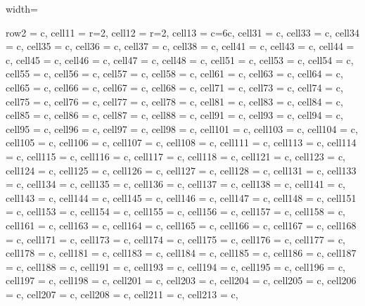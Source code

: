 \documentclass[lettersize,journal]{IEEEtran}
\begin{document}
\begin{table}
\caption{External Similarity and Diversity metrics for experimental datasets.}
\centering
\begin{adjustbox}{width=\textwidth}
\begin{tblr}{
  row{2} = {c}, cell{1}{1} = {r=2}{}, cell{1}{2} = {r=2}{}, cell{1}{3} = {c=6}{c}, cell{3}{1} = {c}, cell{3}{3} = {c}, cell{3}{4} = {c}, cell{3}{5} = {c}, cell{3}{6} = {c}, cell{3}{7} = {c}, cell{3}{8} = {c}, cell{4}{1} = {c},
  cell{4}{3} = {c}, cell{4}{4} = {c}, cell{4}{5} = {c}, cell{4}{6} = {c}, cell{4}{7} = {c}, cell{4}{8} = {c}, cell{5}{1} = {c}, cell{5}{3} = {c}, cell{5}{4} = {c}, cell{5}{5} = {c}, cell{5}{6} = {c}, cell{5}{7} = {c},
  cell{5}{8} = {c}, cell{6}{1} = {c}, cell{6}{3} = {c}, cell{6}{4} = {c}, cell{6}{5} = {c}, cell{6}{6} = {c}, cell{6}{7} = {c}, cell{6}{8} = {c}, cell{7}{1} = {c}, cell{7}{3} = {c}, cell{7}{4} = {c}, cell{7}{5} = {c},
  cell{7}{6} = {c}, cell{7}{7} = {c}, cell{7}{8} = {c}, cell{8}{1} = {c}, cell{8}{3} = {c}, cell{8}{4} = {c}, cell{8}{5} = {c}, cell{8}{6} = {c}, cell{8}{7} = {c}, cell{8}{8} = {c}, cell{9}{1} = {c}, cell{9}{3} = {c},
  cell{9}{4} = {c}, cell{9}{5} = {c}, cell{9}{6} = {c}, cell{9}{7} = {c}, cell{9}{8} = {c}, cell{10}{1} = {c}, cell{10}{3} = {c}, cell{10}{4} = {c}, cell{10}{5} = {c}, cell{10}{6} = {c}, cell{10}{7} = {c}, cell{10}{8} = {c},
  cell{11}{1} = {c}, cell{11}{3} = {c}, cell{11}{4} = {c}, cell{11}{5} = {c}, cell{11}{6} = {c}, cell{11}{7} = {c}, cell{11}{8} = {c}, cell{12}{1} = {c}, cell{12}{3} = {c}, cell{12}{4} = {c}, cell{12}{5} = {c}, cell{12}{6} = {c},
  cell{12}{7} = {c}, cell{12}{8} = {c}, cell{13}{1} = {c}, cell{13}{3} = {c},  cell{13}{4} = {c}, cell{13}{5} = {c}, cell{13}{6} = {c}, cell{13}{7} = {c}, cell{13}{8} = {c}, cell{14}{1} = {c}, cell{14}{3} = {c}, cell{14}{4} = {c},
  cell{14}{5} = {c}, cell{14}{6} = {c}, cell{14}{7} = {c}, cell{14}{8} = {c}, cell{15}{1} = {c}, cell{15}{3} = {c}, cell{15}{4} = {c}, cell{15}{5} = {c}, cell{15}{6} = {c}, cell{15}{7} = {c}, cell{15}{8} = {c}, cell{16}{1} = {c},
  cell{16}{3} = {c}, cell{16}{4} = {c}, cell{16}{5} = {c}, cell{16}{6} = {c}, cell{16}{7} = {c}, cell{16}{8} = {c}, cell{17}{1} = {c}, cell{17}{3} = {c}, cell{17}{4} = {c}, cell{17}{5} = {c}, cell{17}{6} = {c}, cell{17}{7} = {c},
  cell{17}{8} = {c}, cell{18}{1} = {c}, cell{18}{3} = {c}, cell{18}{4} = {c}, cell{18}{5} = {c}, cell{18}{6} = {c}, cell{18}{7} = {c}, cell{18}{8} = {c}, cell{19}{1} = {c}, cell{19}{3} = {c}, cell{19}{4} = {c}, cell{19}{5} = {c},
  cell{19}{6} = {c}, cell{19}{7} = {c}, cell{19}{8} = {c}, cell{20}{1} = {c}, cell{20}{3} = {c}, cell{20}{4} = {c}, cell{20}{5} = {c}, cell{20}{6} = {c}, cell{20}{7} = {c}, cell{20}{8} = {c}, cell{21}{1} = {c}, cell{21}{3} = {c},
}
\end{tblr}
\end{adjustbox}
\end{table}
\end{document}
